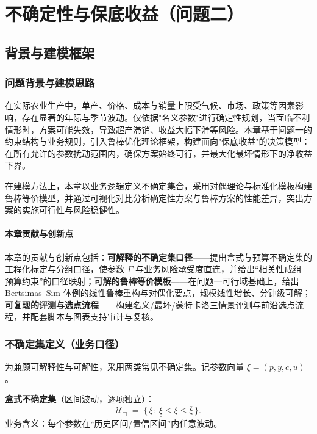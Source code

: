 \graphicspath{{figures/}{../figures/}}
\section{不确定性与保底收益（问题二）}

\subsection{背景与建模框架}
\subsubsection{问题背景与建模思路}
在实际农业生产中，单产、价格、成本与销量上限受气候、市场、政策等因素影响，存在显著的年际与季节波动。仅依据"名义参数"进行确定性规划，当面临不利情形时，方案可能失效，导致超产滞销、收益大幅下滑等风险。本章基于问题一的约束结构与业务规则，引入鲁棒优化理论框架，构建面向"保底收益"的决策模型：在所有允许的参数扰动范围内，确保方案始终可行，并最大化最坏情形下的净收益下界。

在建模方法上，本章以业务逻辑定义不确定集合，采用对偶理论与标准化模板构建鲁棒等价模型，并通过可视化对比分析确定性方案与鲁棒方案的性能差异，突出方案的实施可行性与风险稳健性。

\paragraph{本章贡献与创新点}
\noindent 本章的贡献与创新点包括：\textbf{可解释的不确定集口径}——提出盒式与预算不确定集的工程化标定与分组口径，使参数 $\Gamma$ 与业务风险承受度直连，并给出“相关性成组—预算约束”的口径映射；\textbf{可解的鲁棒等价模板}——在问题一可行域基础上，给出 Bertsimas–Sim 体例的线性鲁棒重构与对偶化要点，规模线性增长、分钟级可解；\textbf{可复现的评测与选点流程}——构建名义/最坏/蒙特卡洛三情景评测与前沿选点流程，并配套脚本与图表支持审计与复核。

\subsubsection{不确定集定义（业务口径）}
为兼顾可解释性与可解性，采用两类常见不确定集。记参数向量 $\xi=(p,y,c,u)$。

\textbf{盒式不确定集}（区间波动，逐项独立）：
\begin{equation}
  \mathcal{U}_{\Box} \;=\; \bigl\{\, \xi:\; \underline{\xi} \le \xi \le \overline{\xi} \,\bigr\}. \label{set:model2-ubox}
\end{equation}
业务含义：每个参数在“历史区间/置信区间”内任意波动。

